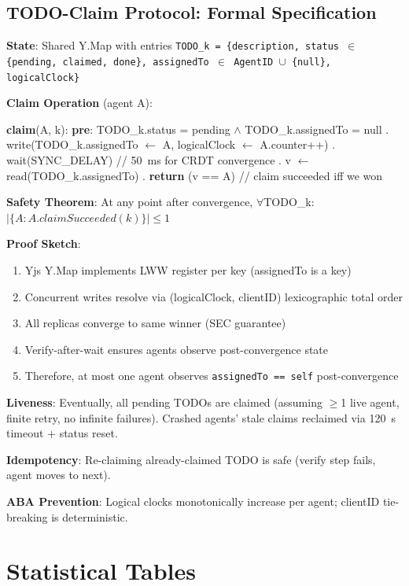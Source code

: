 \documentclass{article}
\begin{document}
\subsection{TODO-Claim Protocol: Formal Specification}

\textbf{State}: Shared Y.Map with entries \texttt{TODO\_k = \{description, status $\in$ \{pending, claimed, done\}, assignedTo $\in$ AgentID $\cup$ \{null\}, logicalClock\}}

\textbf{Claim Operation} (agent A):

\begin{algorithmic}[1]
\STATE \textbf{claim}(A, k):
\STATE \quad \textbf{pre}: TODO\_k.status = pending $\land$ TODO\_k.assignedTo = null
\STATE {}. write(TODO\_k.assignedTo $\leftarrow$ A, logicalClock $\leftarrow$ A.counter++)
\STATE {}. wait(SYNC\_DELAY)  // 50~ms for CRDT convergence
\STATE {}. v $\leftarrow$ read(TODO\_k.assignedTo)
\STATE {}. \textbf{return} (v == A)  // claim succeeded iff we won
\end{algorithmic}

\textbf{Safety Theorem}: At any point after convergence, $\forall$TODO\_k: $|\{A : A.claimSucceeded(k)\}| \leq 1$

\textbf{Proof Sketch}:
\begin{enumerate}
\item Yjs Y.Map implements LWW register per key (assignedTo is a key)
\item Concurrent writes resolve via (logicalClock, clientID) lexicographic total order
\item All replicas converge to same winner (SEC guarantee)
\item Verify-after-wait ensures agents observe post-convergence state
\item Therefore, at most one agent observes \texttt{assignedTo == self} post-convergence
\end{enumerate}

\textbf{Liveness}: Eventually, all pending TODOs are claimed (assuming $\geq$1 live agent, finite retry, no infinite failures). Crashed agents' stale claims reclaimed via 120~s timeout + status reset.

\textbf{Idempotency}: Re-claiming already-claimed TODO is safe (verify step fails, agent moves to next).

\textbf{ABA Prevention}: Logical clocks monotonically increase per agent; clientID tie-breaking is deterministic.

\section{Statistical Tables}
\label{app:stats}
\end{document}

